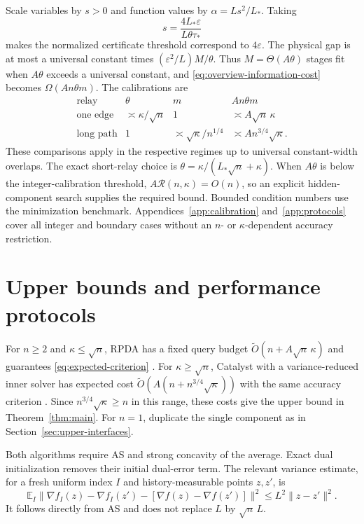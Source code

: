 \documentclass[11pt,letterpaper]{article}
\theoremstyle{definition}
\theoremstyle{remark}
\newcommand{\E}{\mathbb E}
\newcommand{\cR}{\mathcal R}
\begin{document}
Scale variables by $s>0$ and function values by $\alpha=Ls^2/L_*$.
Taking
\[
 s=\frac{4L_*\varepsilon}{L\theta\tau_*}
\]
makes the normalized certificate threshold correspond to $4\varepsilon$.
The physical gap is at most a universal constant times
$(\varepsilon^2/L)M/\theta$. Thus $M=\Theta(A\theta)$ stages fit when
$A\theta$ exceeds a universal constant, and
\eqref{eq:overview-information-cost} becomes $\Omega(An\theta m)$.
The calibrations are
\begin{equation}
\begin{array}{c|c|c|c}
 \text{relay} & \theta & m & An\theta m\\ \hline
 \text{one edge} & \asymp \kappa/\sqrt n & 1 & \asymp A\sqrt n\,\kappa\\
 \text{long path} & 1 & \asymp\sqrt\kappa/n^{1/4}
                  & \asymp An^{3/4}\sqrt\kappa.
\end{array}
\label{eq:overview-calibration}
\end{equation}
These comparisons apply in the respective regimes up to universal
constant-width overlaps. The exact short-relay choice is
$\theta=\kappa/(L_*\sqrt n+\kappa)$.
When $A\theta$ is below the integer-calibration threshold,
$A\cR(n,\kappa)=O(n)$, so an explicit
hidden-component search supplies the required bound. Bounded condition
numbers use the minimization benchmark. Appendices~\ref{app:calibration}
and~\ref{app:protocols} cover all integer and boundary cases without an
$n$- or $\kappa$-dependent accuracy restriction.

\section{Upper bounds and performance protocols}
\label{sec:upper}

For $n\ge2$ and $\kappa\le\sqrt n$, RPDA has a fixed query budget
$\widetilde O(n+A\sqrt n\,\kappa)$ and guarantees
\eqref{eq:expected-criterion} \citep[Theorem 3]{zhou2026}. For
$\kappa\ge\sqrt n$, Catalyst with a variance-reduced inner solver has
expected cost $\widetilde O(A(n+n^{3/4}\sqrt\kappa))$ with the same
accuracy criterion \citep[Theorem 4.1, Corollary 4.1, and Section 4.2]{zhang2021}.
Since $n^{3/4}\sqrt\kappa\ge n$ in this range, these costs give the upper
bound in Theorem~\ref{thm:main}.
For $n=1$, duplicate the single component as in
Section~\ref{sec:upper-interfaces}.

Both algorithms require AS and strong concavity of the average. Exact dual
initialization removes their initial dual-error term. The relevant variance
estimate, for a fresh uniform index $I$ and history-measurable points
$z,z'$, is
\[
 \E_I\|\nabla f_I(z)-\nabla f_I(z')
           -[\nabla f(z)-\nabla f(z')]\|^2
 \le L^2\|z-z'\|^2.
\]
It follows directly from AS and does not replace $L$ by $\sqrt n\,L$.
\end{document}
